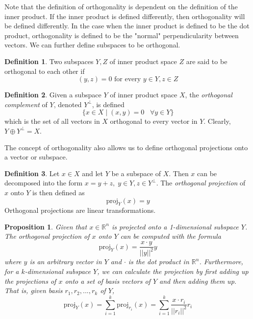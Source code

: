 \documentclass{article}
\newtheorem{proposition}[theorem]{Proposition}
\theoremstyle{remark}
\theoremstyle{definition}
\newtheorem{definition}{Definition}[section]
\begin{document}
  Note that the definition of orthogonality is dependent on the definition of the inner product. If the inner product is defined differently, then orthogonality will be defined differently. In the case when the inner product is defined to be the dot product, orthogonality is defined to be the "normal" perpendicularity between vectors. We can further define subspaces to be orthogonal. 

  \begin{definition}
  Two subspaces $Y, Z$ of inner product space $Z$ are said to be orthogonal to each other if 
  \[(y, z) = 0 \text{   for every } y \in Y, z \in Z\]
  \end{definition}

  \begin{definition}
  Given a subspace $Y$ of inner product space $X$, the \textit{orthogonal complement} of $Y$, denoted $Y^\perp$, is defined
  \[ \{ x \in X \; | \; (x, y) = 0 \;\;\; \forall y \in Y\}\]
  which is the set of all vectors in $X$ orthogonal to every vector in $Y$. Clearly, $Y \oplus Y^\perp = X$. 
  \end{definition}

  The concept of orthogonality also allows us to define orthogonal projections onto a vector or subspace. 

  \begin{definition}
  Let $x \in X$ and let $Y$ be a subspace of $X$. Then $x$ can be decomposed into the form $x = y + z, \; y \in Y, z \in Y^\perp$. The \textit{orthogonal projection} of $x$ onto $Y$ is then defined as 
  \[\text{proj}_Y (x) = y\]
  Orthogonal projections are linear transformations. 
  \end{definition}

  \begin{proposition}
  Given that $x \in \mathbb{R}^n$ is projected onto a 1-dimensional subspace $Y$. The orthogonal projection of $x$ onto $Y$ can be computed with the formula 
  \[\text{proj}_Y (x) = \frac{x \cdot y}{||y||^2} y\]
  where $y$ is an arbitrary vector in $Y$ and $\cdot$ is the dot product in $\mathbb{R}^n$. Furthermore, for a $k$-dimensional subspace $Y$, we can calculate the projection by first adding up the projections of $x$ onto a set of basis vectors of $Y$ and then adding them up. That is, given basis $r_1, r_2, ..., r_k$ of $Y$,
  \begin{equation*}
      \text{proj}_Y (x) = \sum_{i=1}^k \text{proj}_{r_i} (x) = \sum_{i=1}^k \frac{x \cdot r_i}{||r_i||^2} r_i 
  \end{equation*}
  \end{proposition}
\end{document}
